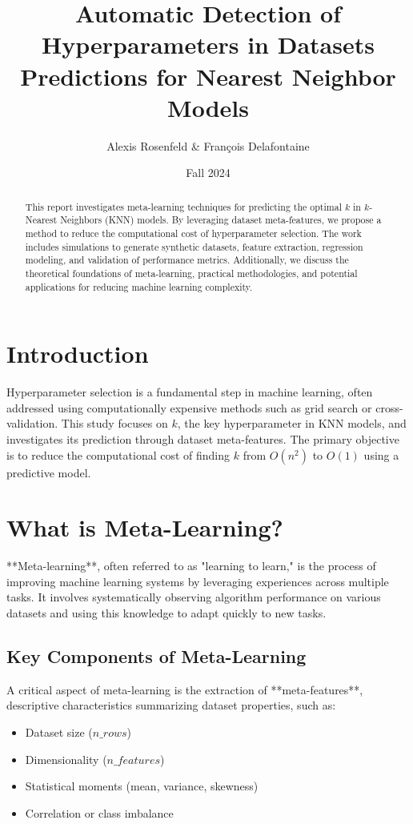 \documentclass[a4paper,11pt]{article}
\title{Automatic Detection of Hyperparameters in Datasets \\
       \large Predictions for Nearest Neighbor Models}
\author{Alexis Rosenfeld \& François Delafontaine}
\date{Fall 2024}
\begin{document}
\maketitle

\begin{abstract}
This report investigates meta-learning techniques for predicting the optimal \(k\) in \(k\)-Nearest Neighbors (KNN) models. By leveraging dataset meta-features, we propose a method to reduce the computational cost of hyperparameter selection. The work includes simulations to generate synthetic datasets, feature extraction, regression modeling, and validation of performance metrics. Additionally, we discuss the theoretical foundations of meta-learning, practical methodologies, and potential applications for reducing machine learning complexity.
\end{abstract}

\tableofcontents

\section{Introduction}
Hyperparameter selection is a fundamental step in machine learning, often addressed using computationally expensive methods such as grid search or cross-validation. This study focuses on \(k\), the key hyperparameter in KNN models, and investigates its prediction through dataset meta-features. The primary objective is to reduce the computational cost of finding \(k\) from \(O(n^2)\) to \(O(1)\) using a predictive model.

\section{What is Meta-Learning?}
**Meta-learning**, often referred to as "learning to learn," is the process of improving machine learning systems by leveraging experiences across multiple tasks. It involves systematically observing algorithm performance on various datasets and using this knowledge to adapt quickly to new tasks.

\subsection{Key Components of Meta-Learning}
A critical aspect of meta-learning is the extraction of **meta-features**, descriptive characteristics summarizing dataset properties, such as:
\begin{itemize}
    \item Dataset size (\(n\_rows\))
    \item Dimensionality (\(n\_features\))
    \item Statistical moments (mean, variance, skewness)
    \item Correlation or class imbalance
\end{itemize}
\end{document}
